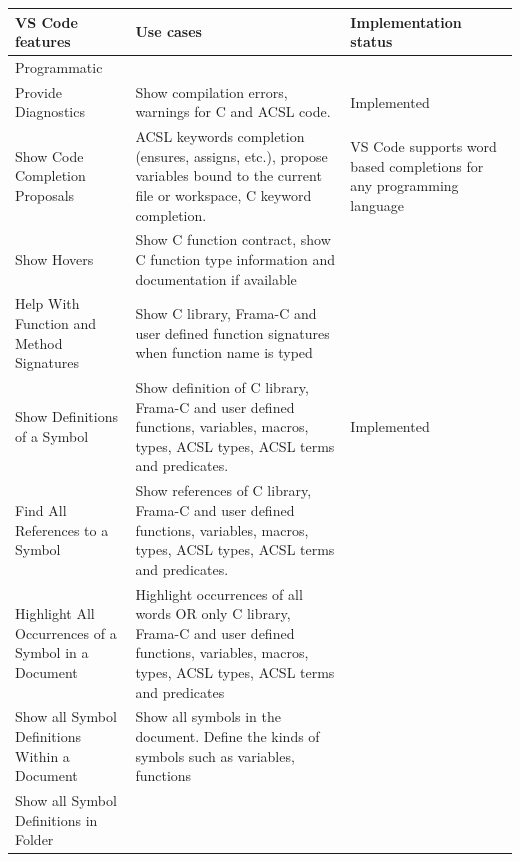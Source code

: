 \documentclass[10pt]{article}
\begin{document}
\begin{singlespace}
\begin{longtable}[H]{| p{2in} | p{2in} | p{2in} |}
	\hline
\multicolumn{1}{|p{2in}|}{\textbf{VS Code features}} &
  \multicolumn{1}{p{2in}|}{\textbf{Use cases}} &
  \textbf{Implementation status} \\ \hline
\multicolumn{3}{|l|}{Programmatic} \\ \hline
\multicolumn{1}{|p{2in}|}{Provide Diagnostics} &
  \multicolumn{1}{p{2in}|}{Show compilation errors, warnings for C and ACSL code.} &
  Implemented \\ \hline
\multicolumn{1}{|p{2in}|}{Show Code Completion Proposals} &
  \multicolumn{1}{p{2in}|}{ACSL keywords completion (ensures, assigns, etc.), propose variables bound to the current file or workspace, C keyword completion.} &
  VS Code supports word based completions for any programming language \\ \hline
\multicolumn{1}{|p{2in}|}{Show Hovers} &
  \multicolumn{1}{p{2in}|}{Show C function contract, show C function type information and documentation if available} &
   \\ \hline
\multicolumn{1}{|p{2in}|}{Help With Function and Method Signatures} &
  \multicolumn{1}{p{2in}|}{Show C library, Frama-C and user defined function signatures when function name is typed} &
   \\ \hline
\multicolumn{1}{|p{2in}|}{Show Definitions of a Symbol} &
  \multicolumn{1}{p{2in}|}{Show definition of C library, Frama-C and user defined functions, variables, macros, types, ACSL types, ACSL terms and predicates.} &
  Implemented \\ \hline
\multicolumn{1}{|p{2in}|}{Find All References to a Symbol} &
  \multicolumn{1}{p{2in}|}{Show references of C library, Frama-C and user defined functions, variables, macros, types, ACSL types, ACSL terms and predicates.} &
   \\ \hline
\multicolumn{1}{|p{2in}|}{Highlight All Occurrences of a Symbol in a Document} &
  \multicolumn{1}{p{2in}|}{Highlight occurrences of all words OR only C library, Frama-C and user defined functions, variables, macros, types, ACSL types, ACSL terms and predicates} &
   \\ \hline
\multicolumn{1}{|p{2in}|}{Show all Symbol Definitions Within a Document} &
  \multicolumn{1}{p{2in}|}{Show all symbols in the document. Define the kinds of symbols such as variables, functions} &
   \\ \hline
\multicolumn{1}{|p{2in}|}{Show all Symbol Definitions in Folder} &

\end{longtable}
\end{singlespace}
\end{document}
